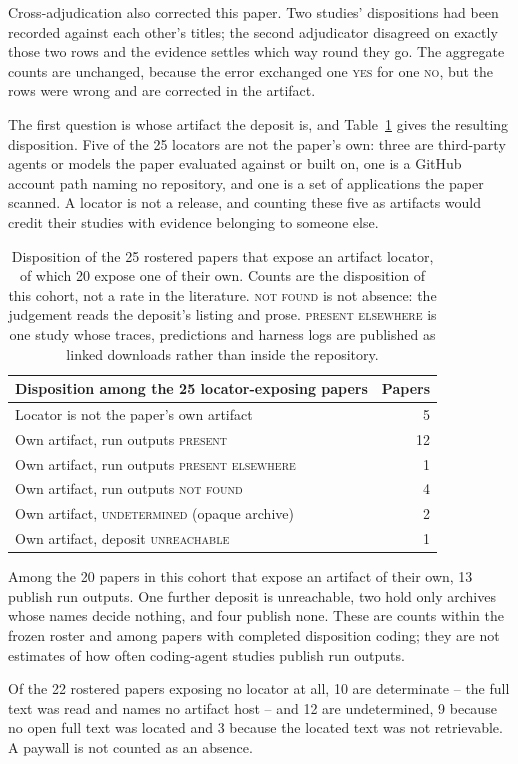 Cross-adjudication also corrected this paper. Two studies' dispositions had been recorded
against each other's titles; the second adjudicator disagreed on exactly those two rows and
the evidence settles which way round they go. The aggregate counts are unchanged, because the
error exchanged one \textsc{yes} for one \textsc{no}, but the rows were wrong and are
corrected in the artifact.

The first question is whose artifact the deposit is, and Table~\ref{tab:corpus} gives the
resulting disposition. Five of the 25 locators are not the
paper's own: three are third-party agents or models the paper evaluated against or built on,
one is a GitHub account path naming no repository, and one is a set of applications the paper
scanned. A locator is not a release, and counting these five as artifacts would credit their
studies with evidence belonging to someone else.

\begin{table}[t]
\caption{Disposition of the 25 rostered papers that expose an artifact locator, of which 20
expose one of their own. Counts are the disposition of this cohort, not a rate in the
literature. \textsc{not found} is not absence: the judgement reads the deposit's listing and
prose. \textsc{present elsewhere} is one study whose traces, predictions and harness logs are
published as linked downloads rather than inside the repository.}
\label{tab:corpus}
\begin{tabular}{lr}
\toprule
Disposition among the 25 locator-exposing papers & Papers \\
\midrule
Locator is not the paper's own artifact & 5 \\
Own artifact, run outputs \textsc{present} & 12 \\
Own artifact, run outputs \textsc{present elsewhere} & 1 \\
Own artifact, run outputs \textsc{not found} & 4 \\
Own artifact, \textsc{undetermined} (opaque archive) & 2 \\
Own artifact, deposit \textsc{unreachable} & 1 \\
\bottomrule
\end{tabular}
\end{table}

Among the 20 papers in this cohort that expose an artifact of their own, 13 publish run
outputs. One further deposit is unreachable, two hold only archives whose names decide
nothing, and four publish none. These are counts within the frozen roster and among papers
with completed disposition coding; they are not estimates of how often coding-agent studies
publish run outputs.

Of the 22 rostered papers exposing no locator at all, 10 are determinate -- the full text was
read and names no artifact host -- and 12 are undetermined, 9 because no open full text was
located and 3 because the located text was not retrievable. A paywall is not counted as an
absence.
